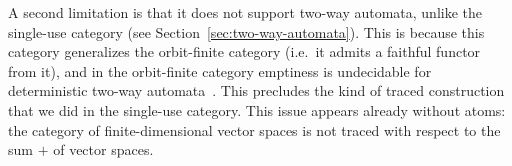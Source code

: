 A second limitation is that it does not support two-way automata, unlike the single-use category (see Section~\ref{sec:two-way-automata}). This is because this category generalizes the orbit-finite category (i.e.~it admits a faithful functor from it), and in the orbit-finite category emptiness is undecidable for deterministic two-way automata~\cite[Theorem 5.3]{nevenFiniteStateMachines2004}. This precludes the kind of traced construction that we did in the single-use category. This issue appears already without atoms: the category of finite-dimensional vector spaces is not traced with respect to the sum $+$ of vector spaces. 

